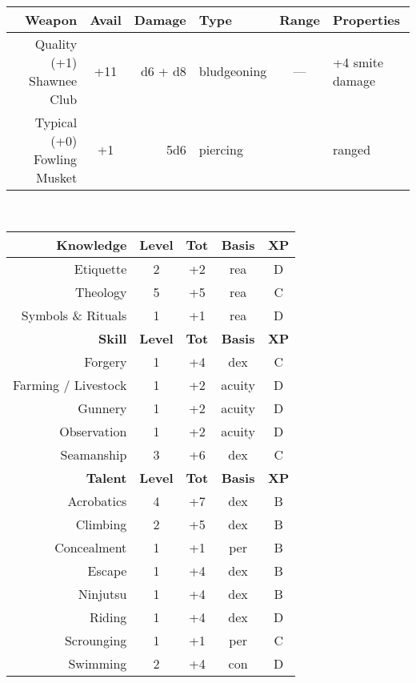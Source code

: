 \documentclass[11pt]{article}
\newcommand{\heading}[1]{{\sc\bfseries #1}}
\begin{document}
%
\\[8pt]
%
\noindent
\begin{tabular}[t]{|r|crl|c|l|}
\hline
\sc\bfseries Weapon & \sc\bfseries Avail & \sc\bfseries Damage
& \sc\bfseries Type & \sc\bfseries Range & \sc\bfseries Properties
\\ \hline\hline
Quality (+1) Shawnee Club & +11 & d6 + d8 & bludgeoning & ---
& +4 smite damage
\\ \hline
Typical (+0) Fowling Musket & +1 & 5d6 & piercing & & ranged
\\ \hline
\end{tabular}
%
\\[12pt]
%
\begin{tabular}[t]{|r|c|c|c|c|}
\hline
%
\heading{Knowledge} & \heading{Level} & \heading{Tot} & \heading{Basis} & \heading{XP}
\\ \hline \hline
\sc Etiquette & 2 & +2 & rea & D
\\
\sc Theology & 5 & +5 & rea & C
\\
\sc Symbols \& Rituals & 1 & +1 & rea & D
\\[12pt] \hline \hline
%
\heading{Skill} & \heading{Level} & \heading{Tot} & \heading{Basis} & \heading{XP}
\\ \hline \hline
\sc Forgery & 1 & +4 & dex & C
\\
\sc Farming / Livestock & 1 & +2 & acuity & D
\\
\sc Gunnery & 1 & +2 & acuity & D
\\
\sc Observation & 1 & +2 & acuity & D
\\
\sc Seamanship & 3 & +6 & dex & C
\\[12pt] \hline \hline
%
\heading{Talent} & \heading{Level} & \heading{Tot} & \heading{Basis} & \heading{XP}
\\ \hline \hline
\sc Acrobatics & 4 & +7 & dex & B
\\
\sc Climbing & 2 & +5 & dex & B
\\
\sc Concealment & 1 & +1 & per & B
\\
\sc Escape & 1 & +4 & dex & B
\\
\sc Ninjutsu & 1 & +4 & dex & B
\\
\sc Riding & 1 & +4 & dex & D
\\
\sc Scrounging & 1 & +1 & per & C
\\
\sc Swimming & 2 & +4 & con & D
\\ \hline
\end{tabular}
%
\ \ \ \ \
%
\end{document}
